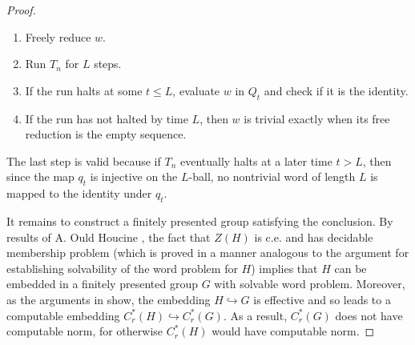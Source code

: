 \documentclass{amsart}
\theoremstyle{plain}
\theoremstyle{definition}
\numberwithin{equation}{section}
\begin{document}
\begin{proof}
\begin{enumerate}
    \item[(i)] Freely reduce $w$.
\item[(ii)] Run $T_n$ for $L$ steps.
\item[(iii)] If the run halts at some $t \leq L$, evaluate $w$ in $Q_t$ and check if it is the identity.
\item[(iv)] If the run has not halted by time $L$, then $w$ is trivial exactly when its free reduction is the empty sequence. 
\end{enumerate}

The last step is valid because if $T_n$ eventually halts at a later time $t>L$, then since the map $q_t$ is injective on the $L$-ball, no nontrivial word of length $L$ is mapped to the identity under $q_t$.

It remains to construct a finitely presented group satisfying the conclusion.  By results of A. Ould Houcine \cite[Theorems I and II]{ouldhoucine}, the fact that $Z(H)$ is c.e. and has decidable membership problem (which is proved in a manner analogous to the argument for establishing solvability of the word problem for $H$) implies that $H$ can be embedded in a finitely presented group $G$ with solvable word problem.  Moreover, as the arguments in \cite{ouldhoucine} show, the embedding $H\hookrightarrow G$ is effective and so leads to a computable embedding $C^*_r(H)\hookrightarrow C^*_r(G)$.  As a result, $C^*_r(G)$ does not have computable norm, for otherwise $C^*_r(H)$ would have computable norm.
\end{proof}
\end{document}
